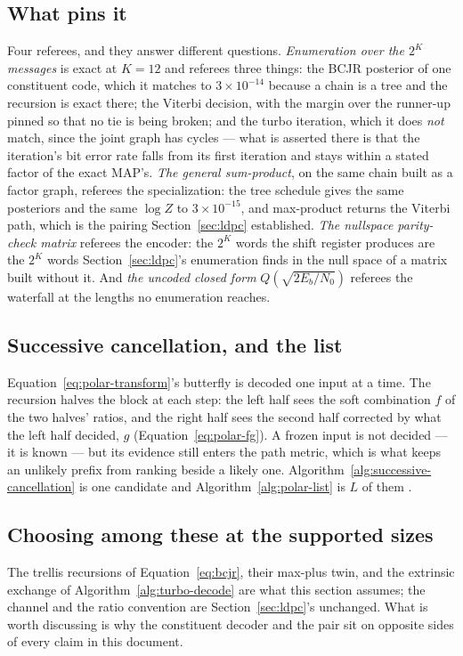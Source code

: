 \documentclass[11pt,a4paper]{article}
\begin{document}
\subsection{What pins it}
Four referees, and they answer different questions. \emph{Enumeration over
the $2^K$ messages} is exact at $K = 12$ and referees three things: the BCJR
posterior of one constituent code, which it matches to $3 \times 10^{-14}$
because a chain is a tree and the recursion is exact there; the Viterbi
decision, with the margin over the runner-up pinned so that no tie is being
broken; and the turbo iteration, which it does \emph{not} match, since the
joint graph has cycles --- what is asserted there is that the iteration's
bit error rate falls from its first iteration and stays within a stated
factor of the exact MAP's. \emph{The general sum-product}, on the same chain
built as a factor graph, referees the specialization: the tree schedule
gives the same posteriors and the same $\log Z$ to $3 \times 10^{-15}$, and
max-product returns the Viterbi path, which is the pairing
Section~\ref{sec:ldpc} established. \emph{The nullspace parity-check matrix}
referees the encoder: the $2^K$ words the shift register produces are the
$2^K$ words Section~\ref{sec:ldpc}'s enumeration finds in the null space of
a matrix built without it. And \emph{the uncoded closed form} $Q(\sqrt{2
E_b/N_0})$ referees the waterfall at the lengths no enumeration reaches.

\subsection{Successive cancellation, and the list}
\label{sec:polar:algorithms}
Equation~\ref{eq:polar-transform}'s butterfly is decoded one input at a time.
The recursion halves the block at each step: the left half sees the soft
combination $f$ of the two halves' ratios, and the right half sees the second
half corrected by what the left half decided, $g$
(Equation~\ref{eq:polar-fg}). A frozen input is not decided --- it is known ---
but its evidence still enters the path metric, which is what keeps an unlikely
prefix from ranking beside a likely one. Algorithm~\ref{alg:successive-cancellation}
is one candidate and Algorithm~\ref{alg:polar-list} is $L$ of them
\citep{arikan2009, talvardy2015}.

\subsection{Choosing among these at the supported sizes}
\label{sec:turbo:discussion}
The trellis recursions of Equation~\ref{eq:bcjr}, their max-plus twin, and
the extrinsic exchange of Algorithm~\ref{alg:turbo-decode} are what this
section assumes; the channel and the ratio convention are
Section~\ref{sec:ldpc}'s unchanged. What is worth discussing is why the
constituent decoder and the pair sit on opposite sides of every claim in
this document.
\end{document}
